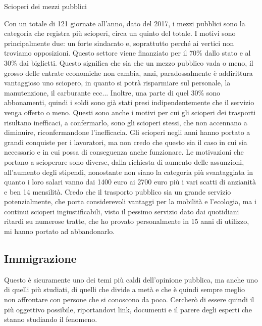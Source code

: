 \documentclass[12pt]{book} %
\begin{document}
\bigskip
\begin{mdframed}[linewidth=1pt]
Scioperi dei mezzi pubblici

Con un totale di 121 giornate all'anno, dato del 2017, i mezzi pubblici sono la categoria che
registra più scioperi, circa un quinto del totale. I motivi sono principalmente due: un forte sindacato e, soprattutto
perché ai vertici non troviamo opposizioni. Questo settore viene finanziato per il 70\% dallo stato e al 30\% dai
biglietti. Questo significa che sia che un mezzo pubblico vada o meno, il grosso delle entrate economiche non cambia,
anzi, paradossalmente è addirittura vantaggioso uno sciopero, in quanto si potrà risparmiare sul personale, la
manutenzione, il carburante ecc... Inoltre, una parte di quel 30\% sono abbonamenti, quindi i soldi sono già stati
presi indipendentemente che il servizio venga offerto o
meno. Questi
sono anche i motivi per cui gli scioperi dei trasporti risultano inefficaci, a confermarlo, sono gli scioperi stessi,
che non accennano a diminuire, riconfermandone l'inefficacia. Gli scioperi negli anni hanno
portato a grandi conquiste per i lavoratori, ma non credo che questo sia il caso in cui sia necessario e in cui possa
di conseguenza anche funzionare. Le motivazioni che portano a scioperare sono diverse, dalla richiesta di aumento delle
assunzioni, all'aumento degli stipendi, nonostante non siano la categoria più svantaggiata in
quanto i loro salari vanno dai 1400 euro ai 2700 euro più i vari scatti di anzianità
e ben 14 mensilità. Credo che il trasporto pubblico sia
un grande servizio potenzialmente, che porta considerevoli vantaggi per la mobilità e l'ecologia,
ma i continui scioperi ingiustificabili, visto il pessimo servizio dato dai quotidiani ritardi su numerose tratte, che
ho provato personalmente in 15 anni di utilizzo, mi hanno portato ad abbandonarlo.
\end{mdframed}

\subsection{Immigrazione}
Questo è sicuramente uno dei temi più caldi dell'opinione pubblica, ma anche uno di quelli più
studiati, di quelli che divide a metà e che è quindi sempre meglio non affrontare con persone che si conoscono da poco.
Cercherò di essere quindi il più oggettivo possibile, riportandovi link, documenti e il parere degli esperti che stanno
studiando il fenomeno.
\end{document}
